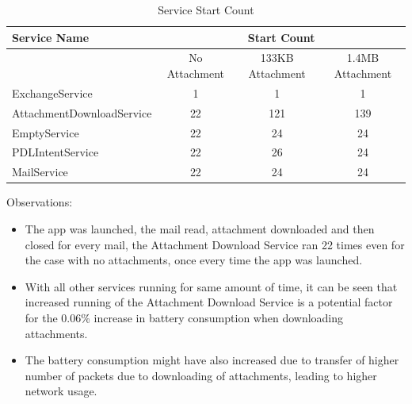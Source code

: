 \documentclass[a4paper,12pt]{article}
\begin{document}
\begin{table}[!h]
\centering
\caption{Service Start Count}
\label{my-label}
\begin{tabular}{|l|c|c|c|}
\hline
Service Name              & \multicolumn{3}{c|}{Start Count}                    \\ \hline
                          & No Attachment & 133KB Attachment & 1.4MB Attachment \\ \hline
ExchangeService           & 1             & 1                & 1                \\ \hline
AttachmentDownloadService & 22             & 121               & 139              \\ \hline
EmptyService              & 22             & 24                & 24                \\ \hline
PDLIntentService          & 22             & 26                & 24                \\ \hline
MailService               & 22             & 24                & 24                \\ \hline
\end{tabular}
\end{table}
\pagebreak
Observations: 
\begin{itemize}
	\item The app was launched, the mail read, attachment downloaded and then closed for every mail, the Attachment Download Service ran 22 times even for the case with no attachments, once every time the app was launched. 
	\item With all other services running for same amount of time, it can be seen that increased running of the Attachment Download Service is a potential factor for the 0.06\% increase in battery consumption when downloading attachments. 
	\item The battery consumption might have also increased due to transfer of higher number of packets due to downloading of attachments, leading to higher network usage.
\end{itemize}
\end{document}
